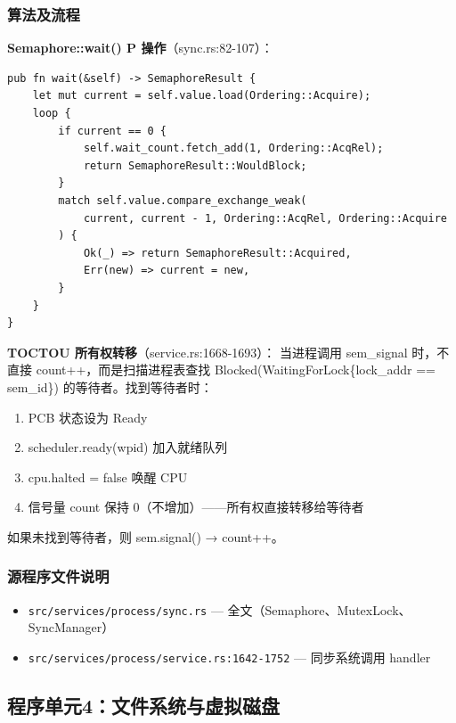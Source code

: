 \documentclass[UTF8,a4paper,12pt]{ctexart}
\begin{document}
\subsubsection{算法及流程}

\textbf{Semaphore::wait() P 操作}（sync.rs:82-107）：

\begin{lstlisting}[]
pub fn wait(&self) -> SemaphoreResult {
    let mut current = self.value.load(Ordering::Acquire);
    loop {
        if current == 0 {
            self.wait_count.fetch_add(1, Ordering::AcqRel);
            return SemaphoreResult::WouldBlock;
        }
        match self.value.compare_exchange_weak(
            current, current - 1, Ordering::AcqRel, Ordering::Acquire
        ) {
            Ok(_) => return SemaphoreResult::Acquired,
            Err(new) => current = new,
        }
    }
}
\end{lstlisting}

\textbf{TOCTOU 所有权转移}（service.rs:1668-1693）：
当进程调用 sem\_signal 时，不直接 count++，而是扫描进程表查找 Blocked(WaitingForLock\{lock\_addr == sem\_id\}) 的等待者。找到等待者时：
\begin{enumerate}[label=(\arabic*)]
    \item PCB 状态设为 Ready
    \item scheduler.ready(wpid) 加入就绪队列
    \item cpu.halted = false 唤醒 CPU
    \item 信号量 count 保持 0（不增加）——所有权直接转移给等待者
\end{enumerate}
如果未找到等待者，则 sem.signal() → count++。

\subsubsection{源程序文件说明}

\begin{itemize}
    \item \texttt{src/services/process/sync.rs} — 全文（Semaphore、MutexLock、SyncManager）
    \item \texttt{src/services/process/service.rs:1642-1752} — 同步系统调用 handler
\end{itemize}

\subsection{程序单元4：文件系统与虚拟磁盘}
\end{document}
